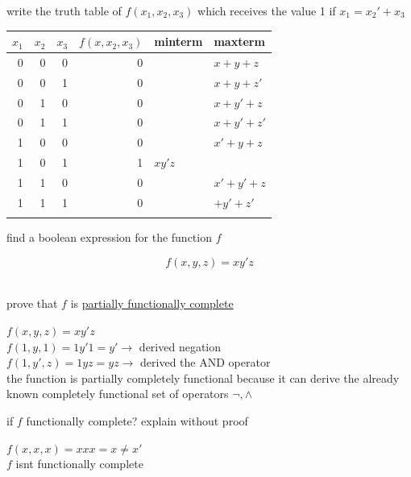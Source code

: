 \documentclass[a4paper,12pt]{article}
\begin{document}
\begin{question}
write the truth table of \(f(x_1,x_2,x_3)\) which receives the value 1 if \(x_1=x_2'+x_3\)\\[0pt]
\begin{answer}
\begin{center}
\begin{tabular}{rrrrll}
\(x_1\) & \(x_2\) & \(x_3\) & \(f(x, x_2, x_3)\) & minterm & maxterm\\[0pt]
\hline
0 & 0 & 0 & 0 &  & \(x+y+z\)\\[0pt]
0 & 0 & 1 & 0 &  & \(x+y+z'\)\\[0pt]
0 & 1 & 0 & 0 &  & \(x+y'+z\)\\[0pt]
0 & 1 & 1 & 0 &  & \(x+y'+z'\)\\[0pt]
1 & 0 & 0 & 0 &  & \(x'+y+z\)\\[0pt]
1 & 0 & 1 & 1 & \(xy'z\) & \\[0pt]
1 & 1 & 0 & 0 &  & \(x'+y'+z\)\\[0pt]
1 & 1 & 1 & 0 &  & \(+y'+z'\)\\[0pt]
 &  &  &  &  & \\[0pt]
\end{tabular}
\end{center}
\end{answer}
\begin{subquestion}
find a boolean expression for the function \(f\)\\[0pt]
\begin{answer}
\[f(x,y,z) = xy'z\]\\[0pt]
\end{answer}
\end{subquestion}
\begin{subquestion}
prove that \(f\) is \href{boolean_algebra.org}{partially functionally complete}\\[0pt]
\begin{answer}
\(f(x,y,z) = xy'z\)\\[0pt]
\(f(1,y,1) = 1y'1 = y' \longrightarrow\) derived negation\\[0pt]
\(f(1,y',z) = 1yz = yz \longrightarrow\) derived the AND operator\\[0pt]
the function is partially completely functional because it can derive the already known completely functional set of operators \(\lnot, \land\)\\[0pt]
\end{answer}
\end{subquestion}
\begin{subquestion}
if \(f\) functionally complete? explain without proof\\[0pt]
\begin{answer}
\(f(x,x,x)=xxx=x\neq x'\)\\[0pt]
\(f\) isnt functionally complete\\[0pt]
\end{answer}
\end{subquestion}
\end{question}
\end{document}

